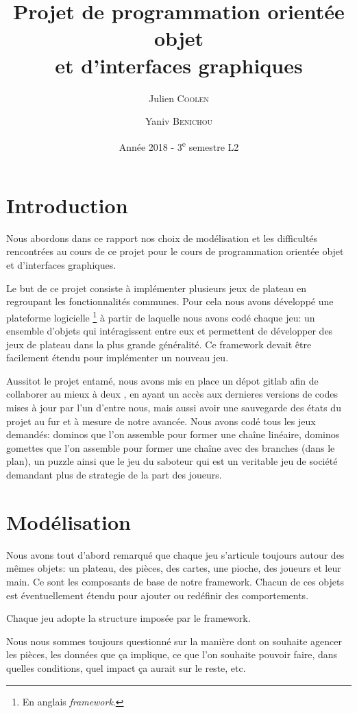 \documentclass[a4paper, 11pt, DIV=9]{scrartcl}
\title{Projet de programmation orientée objet \\ et d'interfaces graphiques}
\author{Julien \textsc{Coolen} \and Yaniv \textsc{Benichou}}
\date{Année 2018 - 3\textsuperscript{e} semestre L2}
\begin{document}
\maketitle

\section{Introduction}

Nous abordons dans ce rapport nos choix de modélisation et
les difficultés rencontrées au cours de ce projet pour le cours de
programmation orientée objet et d’interfaces graphiques.

Le but de ce projet consiste à implémenter plusieurs jeux de
plateau en regroupant les fonctionnalités communes. Pour cela
nous avons développé une plateforme logicielle \footnote{En anglais \textit{framework}.} à partir
de laquelle nous avons codé chaque jeu: un ensemble d'objets qui intéragissent
entre eux et permettent de développer des jeux de plateau dans la plus grande
généralité. Ce framework devait être facilement étendu pour implémenter un
nouveau jeu.

Aussitot le projet entamé, nous avons mis en place un dépot gitlab afin de collaborer 
au mieux à deux , en ayant un accès aux dernieres versions de codes mises à jour par l'un d'entre nous,
mais aussi avoir une sauvegarde des états du projet au fur et à mesure de notre avancée.
Nous avons codé tous les jeux demandés: dominos que l'on assemble pour former
une chaîne linéaire, dominos gomettes que l'on assemble pour former une chaîne avec des
branches (dans le plan), un puzzle ainsi que le jeu du saboteur qui est un veritable jeu de 
société demandant plus de strategie de la part des joueurs.

\section{Modélisation}

Nous avons tout d'abord remarqué que chaque jeu s'articule toujours autour des mêmes objets:
un plateau, des pièces, des cartes, une pioche, des joueurs et leur main.
Ce sont les composants de base de notre framework. Chacun de ces objets est
éventuellement étendu pour ajouter ou redéfinir des comportements.

Chaque jeu adopte la structure imposée par le framework.

Nous nous sommes toujours questionné sur la manière dont on souhaite agencer les
pièces, les données que ça implique, ce que l'on souhaite pouvoir faire, dans
quelles conditions, quel impact ça aurait sur le reste, etc.
\end{document}
